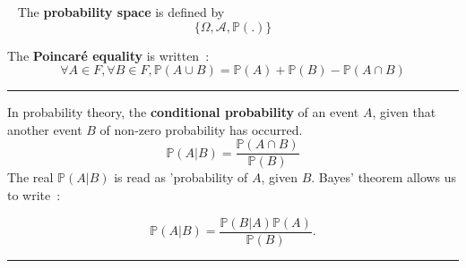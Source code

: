 \begin{f}[Axiomatic]{\ }
	The \textbf{probability space} is defined by
	\[ \lbrace \Omega, \mathcal{A}, \mathbb{P}(.) \rbrace \]
	
	The \textbf{Poincaré equality} is written~:
	$$\forall A \in F, \forall B \in F, \mathbb{P} (A \cup B) = \mathbb{P} (A) + \mathbb{P} (B) - \mathbb{P} (A \cap B)$$
	
\end{f}
\hrule

\begin{f}[Bayes]
	In probability theory, the \textbf{conditional probability} of an event $A$, given that another event $B$ of non-zero probability has occurred.
	$$
	\mathbb{P}(A|B) = \frac{\mathbb{P}(A \cap B)}{\mathbb{P}(B)}
	$$
	The real $\mathbb{P}(A|B)$ is read as 'probability of $A$, given $B$.
	Bayes' theorem allows us to write~:
	
	$$   \mathbb{P}(A|B) = \frac{\mathbb{P}(B|A)\mathbb{P}(A)}{\mathbb{P}(B)}. $$
\end{f}
\hrule

